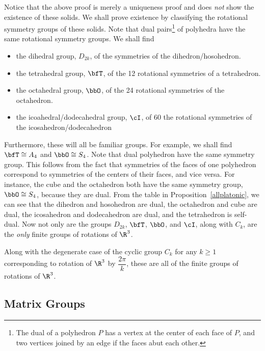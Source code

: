 Notice that the above proof is merely a uniqueness proof and does \emph{not} show the existence of these solids. We shall prove existence by classifying the rotational symmetry groups of these solids. Note that dual pairs\footnote{The dual of a polyhedron $P$ has a vertex at the center of each face of $P$, and two vertices joined by an edge if the faces abut each other.} of polyhedra have the same rotational symmetry groups. We shall find
	\begin{itemize}
	\item the dihedral group, $D_{2k}$, of the symmetries of the dihedron/hosohedron.
	\item the tetrahedral group, $\bfT$, of the 12 rotational symmetries of a tetrahedron. 
	\item the octahedral group, $\bbO$, of the 24 rotational symmetries of the octahedron.
	\item the icoahedral/dodecahedral group, $\cI$, of 60 the rotational symmetries of the icosahedron/dodecahedron
	\end{itemize}

Furthermore, these will all be familiar groups. For example, we shall find $\bfT \cong A_4$ and $\bbO \cong S_4$. Note that dual polyhedron have the same symmetry group. This follows from the fact that symmetries of the faces of one polyhedron correspond to symmetries of the centers of their faces, and vice versa. For instance, the cube and the octahedron both have the same symmetry group, $\bbO \cong S_4$, because they are dual. From the table in Proposition~\ref{allplatonic}, we can see that the dihedron and hosohedron are dual, the octahedron and cube are dual, the icosahedron and dodecahedron are dual, and the tetrahedron is self-dual. Now not only are the groups $D_{2k}$, $\bfT$, $\bbO$, and $\cI$, along with $C_k$, are the \emph{only} finite groups of rotations of $\R^3$.


\begin{thm}
Along with the degenerate case of the cyclic group $C_k$ for any $k \geq 1$ corresponding to rotation of $\R^3$ by $\dfrac{2\pi}{k}$, these are all of the finite groups of rotations of $\R^3$. 
\end{thm}
















\subsection{Matrix Groups}


